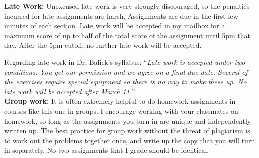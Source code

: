 \documentclass[12pt]{article}
\begin{document}
\noindent
{\bf Late Work: }
Unexcused late work is very strongly discouraged, so the penalties incurred for late assignments are harsh.
Assignments are due in the first few minutes of each section. Late work will be accepted in my mailbox 
for a maximum score of up to half of the total score of the assignment until 5pm that day. After the 5pm cutoff,
no further late work will be accepted. 

Regarding late work in Dr. Balick's syllabus: ``\textit{Late work is accepted under two conditions: You get our permission and we agree on a final due date.  Several of the exercises require special equipment so there is no way to make these up. No late work will be accepted after March 11.}'' \\


\noindent
{\bf Group work: }
It is often extremely helpful to do homework assignments in courses like this one in groups. 
I encourage working with your classmates on homework, so long as the assignments you turn in
are unique and independently written up. The best practice for group work without the threat 
of plagiarism is to work out the problems together once, and write up the copy that you will
turn in separately. No two assignments that I grade should be identical.\\
\end{document}
